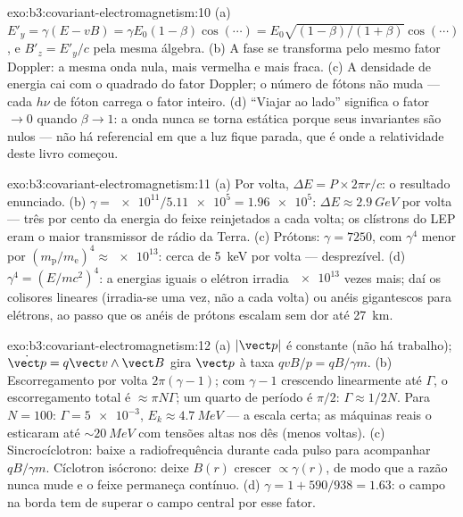 \begin{solution}{exo:b3:covariant-electromagnetism:10}
(a) $E'_y = \gamma(E - vB) = \gamma E_0(1 - \beta)\cos(\cdots) =
E_0\sqrt{(1-\beta)/(1+\beta)}\cos(\cdots)$, e $B'_z = E'_y/c$ pela
mesma álgebra. (b) A fase se transforma pelo mesmo fator Doppler: a
mesma onda nula, mais vermelha e mais fraca. (c) A densidade de energia
cai com o quadrado do fator Doppler; o número de fótons não muda ---
cada $h\nu$ de fóton carrega o fator inteiro. (d) ``Viajar ao lado''
significa o fator $\to 0$ quando $\beta \to 1$: a onda nunca se torna
estática porque seus invariantes são nulos --- não há referencial em
que a luz fique parada, que é onde a relatividade deste livro começou.
\end{solution}

\begin{solution}{exo:b3:covariant-electromagnetism:11}
(a) Por volta, $\Delta E = P \times 2\pi r/c$: o resultado enunciado.
(b) $\gamma = \num{e11}/\num{5.11e5} = \num{1.96e5}$: $\Delta E \approx
\qty{2.9}{GeV}$ por volta --- três por cento da energia do feixe
reinjetados a cada volta; os clístrons do LEP eram o maior transmissor
de rádio da Terra. (c) Prótons: $\gamma = 7250$, com $\gamma^4$ menor
por $(m_{\text{p}}/m_{\text{e}})^4 \approx \num{e13}$: cerca de
\qty{5}{keV} por volta --- desprezível. (d) $\gamma^4 = (E/mc^2)^4$: a
energias iguais o elétron irradia $\num{e13}$ vezes mais; daí os
colisores lineares (irradia-se uma vez, não a cada volta) ou anéis
gigantescos para elétrons, ao passo que os anéis de prótons escalam sem
dor até \qty{27}{km}.
\end{solution}

\begin{solution}{exo:b3:covariant-electromagnetism:12}
(a) $|\vect p|$ é constante (não há trabalho); $\dot{\vect p} = q\vect
v\wedge\vect B$ gira $\vect p$ à taxa $qvB/p = qB/\gamma m$. (b)
Escorregamento por volta $2\pi(\gamma - 1)$; com $\gamma - 1$ crescendo
linearmente até $\Gamma$, o escorregamento total é
$\approx \pi N\Gamma$; um quarto de período é $\pi/2$: $\Gamma \approx 1/2N$.
Para $N = 100$: $\Gamma =
\num{5e-3}$, $E_k \approx \qty{4.7}{MeV}$ --- a escala certa; as
máquinas reais o esticaram até $\sim\qty{20}{MeV}$ com tensões altas
nos dês (menos voltas). (c) Sincrocíclotron: baixe a radiofrequência
durante cada pulso para acompanhar $qB/\gamma m$. Cíclotron isócrono:
deixe $B(r)$ crescer $\propto\gamma(r)$, de modo que a razão nunca mude
e o feixe permaneça contínuo. (d) $\gamma = 1 + 590/938 = 1.63$: o
campo na borda tem de superar o campo central por esse fator.
\end{solution}

